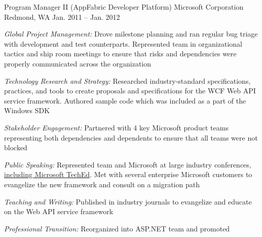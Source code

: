 \begin{cventries}

\cventry 
{Program Manager II (AppFabric Developer Platform)}
{Microsoft Corporation}
{Redmond, WA}
{Jan. 2011 – Jan. 2012}
{ %
\begin{cvitems}
\item {\emph{Global Project Management:} Drove milestone planning and ran regular bug triage with development and test counterparts. Represented team in organizational tactics and ship room meetings to ensure that risks and dependencies were properly communicated across the organization }
\item {\emph{Technology Research and Strategy:} Researched industry-standard specifications, practices, and tools to create proposals and specifications for the WCF Web API service framework. Authored sample code which was included as a part of the Windows SDK }
\item {\emph{Stakeholder Engagement:} Partnered with 4 key Microsoft product teams representing both dependencies and dependents to ensure that all teams were not blocked }
\item {\emph{Public Speaking:} Represented team and Microsoft at large industry conferences, \href{https://channel9.msdn.com/Events/TechEd/NorthAmerica/2011/MID307}{including Microsoft TechEd}. Met with several enterprise Microsoft customers to evangelize the new framework and consult on a migration path }
\item {\emph{Teaching and Writing:} Published in industry journals to evangelize and educate on the Web API service framework }
\item {\emph{Professional Transition:} Reorganized into ASP.NET team and promoted }
\end{cvitems}
}



\end{cventries}

